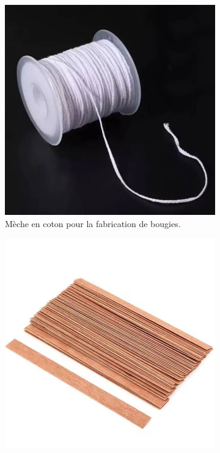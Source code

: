 \documentclass[11pt,fleqn,onecolumn,oneside]{book}
\begin{document}
\begin{figure}[htbp]
    \centering
    \begin{subfigure}[b]{0.45\textwidth} %
        \includegraphics[width=\textwidth]{Pictures/images/chapitre2/meche-coton.jpg}
        \caption{Mèche en coton pour la fabrication de bougies.}
        \label{fig:meche_coton}
    \end{subfigure}
    \hfill %
    \begin{subfigure}[b]{0.45\textwidth} %
        \includegraphics[width=\textwidth]{Pictures/images/chapitre2/meche-bois-2.jpg}

\end{subfigure}
\end{figure}
\end{document}
